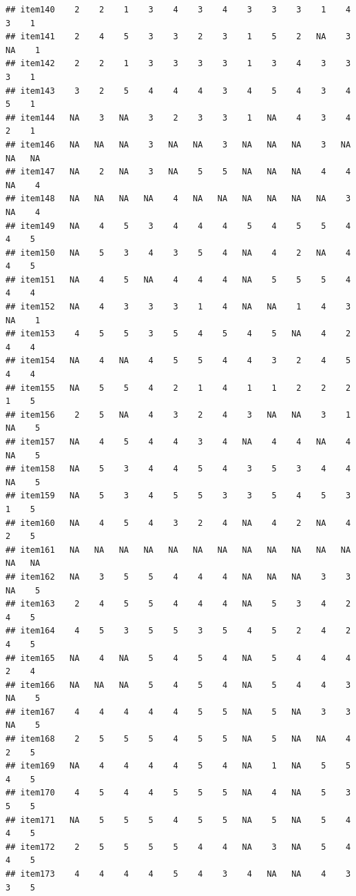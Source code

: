 \documentclass[
  man]{apa6}
\begin{document}
\begin{verbatim}
## item140    2    2    1    3    4    3    4    3    3    3    1    4    3    1
## item141    2    4    5    3    3    2    3    1    5    2   NA    3   NA    1
## item142    2    2    1    3    3    3    3    1    3    4    3    3    3    1
## item143    3    2    5    4    4    4    3    4    5    4    3    4    5    1
## item144   NA    3   NA    3    2    3    3    1   NA    4    3    4    2    1
## item146   NA   NA   NA    3   NA   NA    3   NA   NA   NA    3   NA   NA   NA
## item147   NA    2   NA    3   NA    5    5   NA   NA   NA    4    4   NA    4
## item148   NA   NA   NA   NA    4   NA   NA   NA   NA   NA   NA    3   NA    4
## item149   NA    4    5    3    4    4    4    5    4    5    5    4    4    5
## item150   NA    5    3    4    3    5    4   NA    4    2   NA    4    4    5
## item151   NA    4    5   NA    4    4    4   NA    5    5    5    4    4    4
## item152   NA    4    3    3    3    1    4   NA   NA    1    4    3   NA    1
## item153    4    5    5    3    5    4    5    4    5   NA    4    2    4    4
## item154   NA    4   NA    4    5    5    4    4    3    2    4    5    4    4
## item155   NA    5    5    4    2    1    4    1    1    2    2    2    1    5
## item156    2    5   NA    4    3    2    4    3   NA   NA    3    1   NA    5
## item157   NA    4    5    4    4    3    4   NA    4    4   NA    4   NA    5
## item158   NA    5    3    4    4    5    4    3    5    3    4    4   NA    5
## item159   NA    5    3    4    5    5    3    3    5    4    5    3    1    5
## item160   NA    4    5    4    3    2    4   NA    4    2   NA    4    2    5
## item161   NA   NA   NA   NA   NA   NA   NA   NA   NA   NA   NA   NA   NA   NA
## item162   NA    3    5    5    4    4    4   NA   NA   NA    3    3   NA    5
## item163    2    4    5    5    4    4    4   NA    5    3    4    2    4    5
## item164    4    5    3    5    5    3    5    4    5    2    4    2    4    5
## item165   NA    4   NA    5    4    5    4   NA    5    4    4    4    2    4
## item166   NA   NA   NA    5    4    5    4   NA    5    4    4    3   NA    5
## item167    4    4    4    4    4    5    5   NA    5   NA    3    3   NA    5
## item168    2    5    5    5    4    5    5   NA    5   NA   NA    4    2    5
## item169   NA    4    4    4    4    5    4   NA    1   NA    5    5    4    5
## item170    4    5    4    4    5    5    5   NA    4   NA    5    3    5    5
## item171   NA    5    5    5    4    5    5   NA    5   NA    5    4    4    5
## item172    2    5    5    5    5    4    4   NA    3   NA    5    4    4    5
## item173    4    4    4    4    5    4    3    4   NA   NA    4    3    3    5

\end{verbatim}
\end{document}
